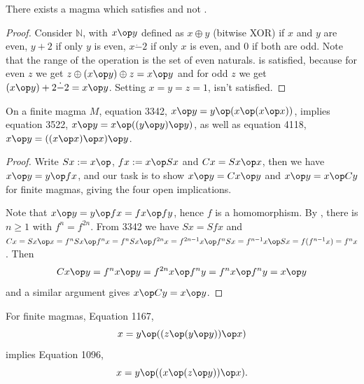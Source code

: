 \begin{proposition}\label{non_imp_3994_3588_thm}
  \leanok
  There exists a magma which satisfies  and not .
\end{proposition}

\begin{proof} \leanok
  Consider $\mathbb{N}$, with $x \op y$ defined as $x \oplus y$ (bitwise XOR) if $x$ and $y$ are even,
  $y+2$ if only $y$ is even, $x \dot - 2$ if only $x$ is even, and $0$ if both are odd.
  Note that the range of the operation is the set of even naturals.
   is satisfied, because for even $z$ we get $z \oplus (x \op y) \oplus z = x \op y$
  and for odd $z$ we get $(x \op y) + 2 \dot - 2 = x \op y$.
  Setting $x = y = z = 1$,  isn't satisfied.
\end{proof}

\begin{proposition}[3342]\label{3342}  \leanok  On a finite magma $M$, equation 3342, $x \op y= y \op (x \op (x \op x))$, implies
  equation 3522, $x \op y = x \op ((y \op y) \op y)$, as well as equation 4118, $x \op y = ((x \op x) \op x) \op y$.
\end{proposition}

\begin{proof} \leanok Write $Sx := x \op$, $fx := x \op Sx$ and $Cx = Sx \op x$, then we have $x \op y= y \op fx$, and our task is to show $x \op y = Cx \op y$ and $x \op y = x \op Cy$ for finite magmas, giving the four open implications.

Note that $x \op y= y \op fx = fx \op fy$, hence $f$ is a homomorphism.  By , there is $n \geq 1$ with $f^n = f^{2n}$.  From 3342 we have $Sx = S fx$ and $Cx = Sx \op x = f^n Sx \op f^n x = f^n Sx \op f^{2n} x = f^{2n-1} x \op f^n Sx = f^{n-1} x \op S x = f(f^{n-1} x) = f^n x$.  Then
$$ Cx \op y = f^n x \op y = f^{2n} x \op f^n y = f^n x \op f^n y = x \op y$$
and a similar argument gives $x \op Cy = x \op y$.
\end{proof}

\begin{proposition}[1167 implies 1096]\label{1167-1096}\leanok{}
  For finite magmas, Equation 1167,
  $$ x = y \op ((z \op (y \op y)) \op x)$$
implies Equation 1096,
$$ x = y \op ((x \op (z \op y)) \op x).$$
\end{proposition}

